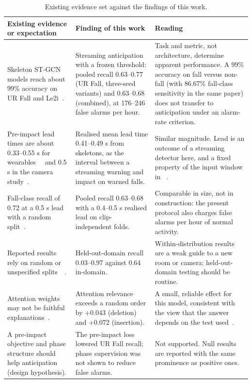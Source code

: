 \documentclass[journal]{IEEEtran}
\begin{document}
\begin{table}[!t]
\renewcommand{\arraystretch}{1.15}
\caption{Existing evidence set against the findings of this work.}
\label{tab:compare}
\centering
\footnotesize
\begin{tabular}{p{}p{}p{}}
\hline
Existing evidence or expectation & Finding of this work & Reading \\
\hline
Skeleton ST-GCN models reach about 99\% accuracy on UR Fall and Le2i~\cite{shin}. & Streaming anticipation with a frozen threshold: pooled recall 0.63--0.77 (UR Fall, three-seed variants) and 0.63--0.68 (combined), at 176--246 false alarms per hour. & Task and metric, not architecture, determine apparent performance. A 99\% accuracy on fall versus non-fall (with 86.67\% fall-class sensitivity in the same paper) does not transfer to anticipation under an alarm-rate criterion. \\
Pre-impact lead times are about 0.33--0.55 s for wearables~\cite{kfall}~\cite{prefallkd} and 0.5 s in the camera study~\cite{jesudhas}. & Realised mean lead time 0.41--0.49 s from skeletons, as the interval between a streaming warning and impact on warned falls. & Similar magnitude. Lead is an outcome of a streaming detector here, and a fixed property of the input window in ~\cite{jesudhas}. \\
Fall-class recall of 0.72 at a 0.5 s lead with a random split~\cite{jesudhas}. & Pooled recall 0.63--0.68 with a 0.4--0.5 s realised lead on clip-independent folds. & Comparable in size, not in construction: the present protocol also charges false alarms per hour of normal activity. \\
Reported results rely on random or unspecified splits~\cite{jesudhas}~\cite{shin}. & Held-out-domain recall 0.03--0.97 against 0.64 in-domain. & Within-distribution results are a weak guide to a new room or camera; held-out-domain testing should be routine. \\
Attention weights may not be faithful explanations~\cite{jain}. & Attention relevance exceeds a random order by +0.043 (deletion) and +0.072 (insertion). & A small, reliable effect for this model, consistent with the view that the answer depends on the test used~\cite{wiegreffe}. \\
A pre-impact objective and phase structure should help anticipation (design hypothesis). & The pre-impact loss lowered UR Fall recall; phase supervision was not shown to reduce false alarms. & Not supported. Null results are reported with the same prominence as positive ones. \\
\hline
\end{tabular}
\end{table}
\end{document}
